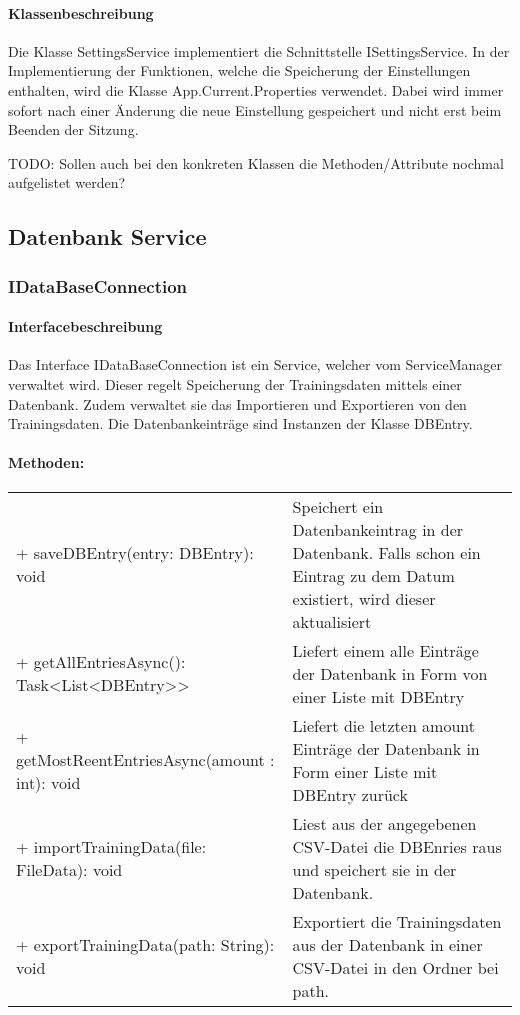 \documentclass[a4paper,12pt]{article}
\begin{document}
	\paragraph{Klassenbeschreibung}
	Die Klasse SettingsService implementiert die Schnittstelle ISettingsService. In der Implementierung der Funktionen, welche die Speicherung der Einstellungen enthalten, wird die Klasse App.Current.Properties verwendet.
	Dabei wird immer sofort nach einer Änderung die neue Einstellung gespeichert und nicht erst beim Beenden der Sitzung.
	
	
	TODO: Sollen auch bei den konkreten Klassen die Methoden/Attribute nochmal aufgelistet werden?
\subsection{Datenbank Service}
\subsubsection{IDataBaseConnection}
	\paragraph{Interfacebeschreibung}
	Das Interface IDataBaseConnection ist ein Service, welcher vom ServiceManager verwaltet wird. Dieser regelt Speicherung der Trainingsdaten mittels einer \gls{Datenbank}. Zudem verwaltet sie das Importieren und Exportieren von den Trainingsdaten.
	Die Datenbankeinträge sind Instanzen der Klasse DBEntry. 
	
	\paragraph{Methoden:}
	\begin{tabular}{p{7cm}p{10cm}}
		+ saveDBEntry(entry: DBEntry): void & Speichert ein Datenbankeintrag in der \gls{Datenbank}. Falls schon ein Eintrag zu dem Datum existiert, wird dieser aktualisiert\\
		+ getAllEntriesAsync(): Task<List<DBEntry>> &Liefert einem alle Einträge der Datenbank in Form von einer Liste mit DBEntry \\ 
		+ getMostReentEntriesAsync(amount : int): void &Liefert  die letzten amount Einträge der Datenbank in Form einer Liste mit DBEntry zurück\\
		+ importTrainingData(file: FileData): void & Liest aus der angegebenen \gls{CSV}-Datei die DBEnries raus und speichert sie in der \gls{Datenbank}.\\
		+ exportTrainingData(path: String): void& Exportiert die Trainingsdaten aus der \gls{Datenbank} in einer \gls{CSV}-Datei in den Ordner bei path. \\
	\end{tabular}
\end{document}
